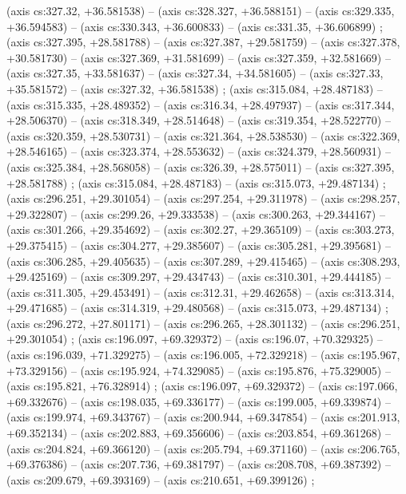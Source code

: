     (axis cs:327.32,    +36.581538) --  (axis cs:328.327,    +36.588151) --  (axis cs:329.335,    +36.594583) --  (axis cs:330.343,    +36.600833) --  (axis cs:331.35,    +36.606899) ;
    (axis cs:327.395,    +28.581788) --  (axis cs:327.387,    +29.581759) --  (axis cs:327.378,    +30.581730) --  (axis cs:327.369,    +31.581699) --  (axis cs:327.359,    +32.581669) --  (axis cs:327.35,    +33.581637) --  (axis cs:327.34,    +34.581605) --  (axis cs:327.33,    +35.581572) --  (axis cs:327.32,    +36.581538) ;
    (axis cs:315.084,    +28.487183) --  (axis cs:315.335,    +28.489352) --  (axis cs:316.34,    +28.497937) --  (axis cs:317.344,    +28.506370) --  (axis cs:318.349,    +28.514648) --  (axis cs:319.354,    +28.522770) --  (axis cs:320.359,    +28.530731) --  (axis cs:321.364,    +28.538530) --  (axis cs:322.369,    +28.546165) --  (axis cs:323.374,    +28.553632) --  (axis cs:324.379,    +28.560931) --  (axis cs:325.384,    +28.568058) --  (axis cs:326.39,    +28.575011) --  (axis cs:327.395,    +28.581788) ;
    (axis cs:315.084,    +28.487183) --  (axis cs:315.073,    +29.487134) ;
    (axis cs:296.251,    +29.301054) --  (axis cs:297.254,    +29.311978) --  (axis cs:298.257,    +29.322807) --  (axis cs:299.26,    +29.333538) --  (axis cs:300.263,    +29.344167) --  (axis cs:301.266,    +29.354692) --  (axis cs:302.27,    +29.365109) --  (axis cs:303.273,    +29.375415) --  (axis cs:304.277,    +29.385607) --  (axis cs:305.281,    +29.395681) --  (axis cs:306.285,    +29.405635) --  (axis cs:307.289,    +29.415465) --  (axis cs:308.293,    +29.425169) --  (axis cs:309.297,    +29.434743) --  (axis cs:310.301,    +29.444185) --  (axis cs:311.305,    +29.453491) --  (axis cs:312.31,    +29.462658) --  (axis cs:313.314,    +29.471685) --  (axis cs:314.319,    +29.480568) --  (axis cs:315.073,    +29.487134) ;
    (axis cs:296.272,    +27.801171) --  (axis cs:296.265,    +28.301132) --  (axis cs:296.251,    +29.301054) ;
    (axis cs:196.097,    +69.329372) --  (axis cs:196.07,    +70.329325) --  (axis cs:196.039,    +71.329275) --  (axis cs:196.005,    +72.329218) --  (axis cs:195.967,    +73.329156) --  (axis cs:195.924,    +74.329085) --  (axis cs:195.876,    +75.329005) --  (axis cs:195.821,    +76.328914) ;
    (axis cs:196.097,    +69.329372) --  (axis cs:197.066,    +69.332676) --  (axis cs:198.035,    +69.336177) --  (axis cs:199.005,    +69.339874) --  (axis cs:199.974,    +69.343767) --  (axis cs:200.944,    +69.347854) --  (axis cs:201.913,    +69.352134) --  (axis cs:202.883,    +69.356606) --  (axis cs:203.854,    +69.361268) --  (axis cs:204.824,    +69.366120) --  (axis cs:205.794,    +69.371160) --  (axis cs:206.765,    +69.376386) --  (axis cs:207.736,    +69.381797) --  (axis cs:208.708,    +69.387392) --  (axis cs:209.679,    +69.393169) --  (axis cs:210.651,    +69.399126) ;

